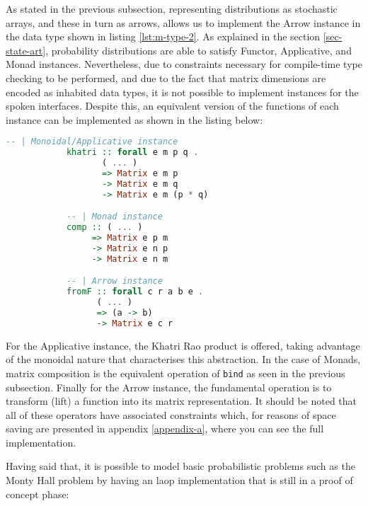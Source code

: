\documentclass[
  oneside,
  11pt, a4paper,
  footinclude=true,
  headinclude=true,
  cleardoublepage=empty
]{scrbook}
\theoremstyle{definition}
\theoremstyle{definition}
\begin{document}
        As stated in the previous subsection, representing distributions as stochastic arrays, and these in turn as arrows, allows us to implement the Arrow instance in the data type shown in listing \ref{lst:m-type-2}. As explained in the section \ref{sec-state-art}, probability distributions are able to satisfy Functor, Applicative, and Monad instances. Nevertheless, due to constraints necessary for compile-time type checking to be performed, and due to the fact that matrix dimensions are encoded as inhabited data types, it is not possible to implement instances for the spoken interfaces. Despite this, an equivalent version of the functions of each instance can be implemented as shown in the listing below:
        
        \begin{lstlisting}[language=Haskell, caption={Interface equivalent function implementations},captionpos=b]
            -- | Monoidal/Applicative instance
            khatri :: forall e m p q .
                   ( ... )
                   => Matrix e m p 
                   -> Matrix e m q
                   -> Matrix e m (p * q)

            -- | Monad instance
            comp :: ( ... )
                 => Matrix e p m
                 -> Matrix e n p 
                 -> Matrix e n m

            -- | Arrow instance
            fromF :: forall c r a b e . 
                  ( ... ) 
                  => (a -> b) 
                  -> Matrix e c r
        \end{lstlisting}{}
        
        For the Applicative instance, the Khatri Rao product is offered, taking advantage of the monoidal nature that characterises this abstraction. In the case of Monads, matrix composition is the equivalent operation of \texttt{bind} as seen in the previous subsection. Finally for the Arrow instance, the fundamental operation is to transform (lift) a function into its matrix representation. It should be noted that all of these operators have associated constraints which, for reasons of space saving are presented in appendix \ref{appendix-a}, where you can see the full implementation.
        
        Having said that, it is possible to model basic probabilistic problems such as the Monty Hall problem by having an \gls{laop} implementation that is still in a proof of concept phase:
        
\end{document}
